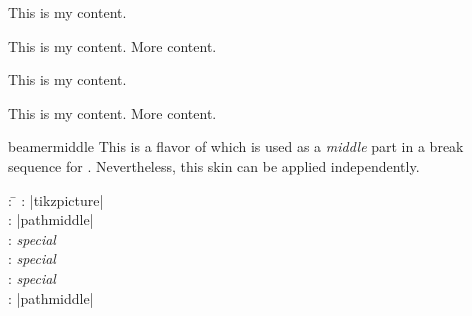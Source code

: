 \begin{dispExample}
\begin{tcbraster}[beamer,skin=beamerfirst,raster equal height,raster columns=4,
    colback=LightGreen,colframe=DarkGreen,
    left=1mm,right=1mm,top=1mm,bottom=1mm,middle=1mm]
  \begin{tcolorbox}
    This is my content.
  \end{tcolorbox}
  \begin{tcolorbox}
    This is my content.
    \tcblower
    More content.
  \end{tcolorbox}
  \begin{tcolorbox}[adjusted title=My title]
    This is my content.
  \end{tcolorbox}
  \begin{tcolorbox}[adjusted title=My title]
    This is my content.
    \tcblower
    More content.
  \end{tcolorbox}
\end{tcbraster}
\end{dispExample}


\clearpage

\begin{docSkin}{beamermiddle}
This is a flavor of  which is used as a \emph{middle} part
in a break sequence for .
Nevertheless, this skin can be applied independently.
\begin{tcolorbox}[skintable=beamermiddle]
  \begin{tabbing}
    : \=\kill
    :  \> |tikzpicture|\\ 
    :           \> |pathmiddle|\\
    : \> \emph{special}\\ 
    :        \> \emph{special}\\
    :    \> \emph{special}\\
    :           \> |pathmiddle|
  \end{tabbing}
\end{tcolorbox}
\end{docSkin}


